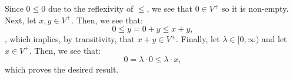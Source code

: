 %
%
\label {sol: every vector space with a compatible preorder is a preordered vector space}Since $0 \leq 0$ due to the reflexivity of $\leq$, we see that $0 \in V^+$ so it is non-empty. Next, let $x,y \in V^+$. Then, we see that:
\[0 \leq y = 0+y \leq x+y,\],
which implies, by transitivity, that $x+y \in V^+$. Finally, let $\lambda \in [0,\infty)$ and let $x \in V^+$. Then, we see that:
\[0 = \lambda \cdot 0 \leq \lambda \cdot x,\]
which proves the desired result.
